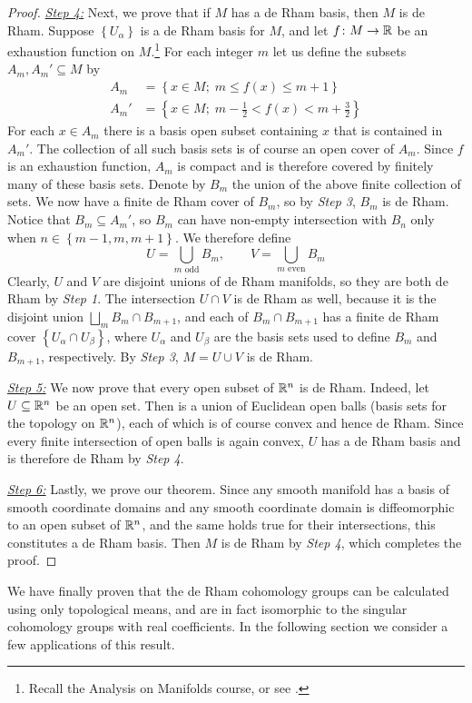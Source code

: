 \documentclass[a4paper, 12pt]{article}
\begin{document}
\begin{proof}
    \underline{\emph{Step 4:}}
    Next, we prove that if $M$ has a de Rham basis, then $M$ is de Rham.
    Suppose $\left\{ U_\alpha \right\}$ is a de Rham basis for $M$,
    and let $f \colon M \to \mathbb{R}$ be an exhaustion function on $M$.\footnote{Recall the Analysis on Manifolds course, or see \cite[p. 46]{Lee2012}.}
    For each integer $m$ let us define the subsets $A_m, A_m' \subseteq M$ by
    \begin{align*}
        A_m &= \left\{ x \in M ; \; m \leq f(x) \leq m + 1 \right\} \\
        A_m'&= \left\{ x \in M ; \; m - \frac{1}{2} < f(x) < m + \frac{3}{2} \right\}
    \end{align*}
    For each $x \in A_m$ there is a basis open subset containing $x$ that is contained in $A_m'$.
    The collection of all such basis sets is of course an open cover of $A_m$.
    Since $f$ is an exhaustion function, $A_m$ is compact and is therefore covered by finitely many of these basis sets.
    Denote by $B_m$ the union of the above finite collection of sets.
    We now have a finite de Rham cover of $B_m$, so by \emph{Step 3}, $B_m$ is de Rham.
    Notice that $B_m \subseteq A_m'$, so $B_m$ can have non-empty intersection with $B_n$ only when $n \in \left\{ m-1, m, m+1 \right\}$.
    We therefore define
    \[
        U = \bigcup_{m \text{ odd}} B_m, \quad\quad V = \bigcup_{m \text{ even}} B_m
    \]
    Clearly, $U$ and $V$ are disjoint unions of de Rham manifolds, so they are both de Rham by \emph{Step 1}.
    The intersection $U \cap V$ is de Rham as well, because it is the disjoint union $\bigsqcup_m B_m \cap B_{m+1}$,
    and each of $B_m \cap B_{m+1}$ has a finite de Rham cover $\left\{ U_\alpha \cap U_{\beta} \right\}$,
    where $U_\alpha$ and $U_\beta$ are the basis sets used to define $B_m$ and $B_{m+1}$, respectively.
    By \emph{Step 3}, $M = U \cup V$ is de Rham.

    \underline{\emph{Step 5:}}
    We now prove that every open subset of $\mathbb{R}^n$ is de Rham.
    Indeed, let $U \subseteq \mathbb{R}^n$ be an open set.
    Then is a union of Euclidean open balls (basis sets for the topology on $\mathbb{R}^n$),
    each of which is of course convex and hence de Rham.
    Since every finite intersection of open balls is again convex, $U$ has a de Rham basis and is therefore de Rham by \emph{Step 4}.

    \underline{\emph{Step 6:}}
    Lastly, we prove our theorem.
    Since any smooth manifold has a basis of smooth coordinate domains and any
    smooth coordinate domain is diffeomorphic to an open subset of $\mathbb{R}^n$, and
    the same holds true for their intersections, this constitutes a de Rham
    basis. Then $M$ is de Rham by \emph{Step 4}, which completes the proof.
\end{proof}
We have finally proven that the de Rham cohomology groups can be calculated using only topological means,
and are in fact isomorphic to the singular cohomology groups with real coefficients.
In the following section we consider a few applications of this result.
\end{document}
